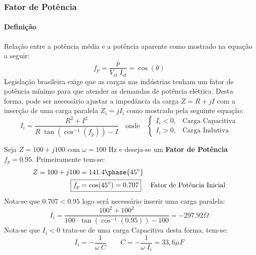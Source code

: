 \documentclass{article}
\begin{document}
        \subsubsection{Fator de Potência}
            \paragraph{Definição}Relação entre a potência média e a potência aparente como mostrado na equação a seguir:
                \begin{equation}
                    \boxed{
                        f_{p} = \frac{\bar{p}}{V_{\text{ef}}\;I_{\text{ef}}} = \cos(\theta)
                    }
                \end{equation}
            Legislação brasileira exige que as cargas nas indústrias tenham um fator de potência mínimo para que atender as demandas de potência elétrica. Desta forma, pode ser necessário ajustar a impedância da carga $Z = R + jI$ com a inserção de uma carga paralela $Z_{i} = j I_{i}$ como mostrado pela seguinte equação:
                \begin{equation}
                    \boxed{
                        I_{i} = \frac{R^2 + I^2}{R\;\tan(\cos^{-1}(f_{p})) - I}
                    }
                    \quad
                    \text{onde}
                    \quad
                    \begin{cases}
                        I_{i} < 0, & \text{Carga Capacitiva}\\
                        I_{i} > 0, & \text{Carga Indutiva}
                    \end{cases}
                \end{equation}
                \begin{example}
                    Seja $Z = 100 + j100$ com $\omega = 100$ Hz e deseja-se um \textbf{Fator de Potência} $f_{p} = 0.95$. Primeiramente tem-se:
                        \begin{align*}
                            Z = 100 + j100 &= 141.4\phase{45^{\circ}}\\
                            \Aboxed{
                                f_{p} &= \cos(45^{\circ}) = 0.707
                            } & \text{Fator de Potência Inicial}
                        \end{align*}
                    Nota-se que $0.707 < 0.95$ logo será necessário inserir uma carga paralela:
                        \begin{equation*}
                            I_{i} = \frac{100^2 + 100^2}{100\cdot\tan(\cos^{-1}(0.95)) - 100} = -297.92 \Omega
                        \end{equation*}
                    Nota-se que $I_{i} < 0$ trata-se de uma carga Capacitiva desta forma, tem-se: 
                        \begin{equation*}
                            I_{i} = -\frac{1}{\omega\;C}
                            \qquad
                            \boxed{
                                C = - \frac{1}{\omega\;I_{i}} = 33,6 \mu F
                            }
                        \end{equation*}
                \end{example}
\end{document}
